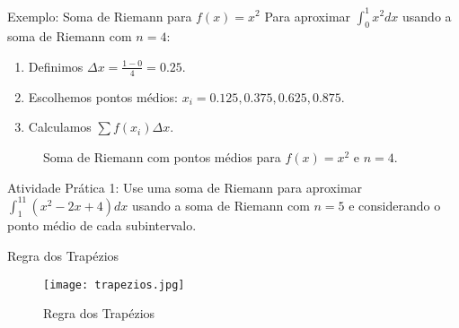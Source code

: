 \documentclass{beamer}
\begin{document}
\begin{frame}{Exemplo: Soma de Riemann para \( f(x) = x^2 \)}
    Para aproximar \( \int_{0}^{1} x^2 dx \) usando a soma de Riemann com \( n=4 \):
    \begin{enumerate}
        \item Definimos \( \Delta x = \displaystyle \frac{1-0}{4} = 0.25 \).
        \item Escolhemos pontos médios: \( x_i = 0.125, 0.375, 0.625, 0.875 \).
        \item Calculamos \( \sum f(x_i) \Delta x \).
    \end{enumerate}

    \begin{figure}[h]
    \centering
    \caption{Soma de Riemann com pontos médios para \( f(x) = x^2 \) e \( n=4 \).}
\end{figure}

\end{frame}

\begin{frame}{Atividade Prática 1:}
    Use uma soma de Riemann para aproximar \( \displaystyle \int_{1}^{11} (x^2 - 2x + 4) dx \) usando a soma de Riemann com \( n=5 \) e considerando o ponto médio de cada subintervalo.

\end{frame}

\begin{frame}{Regra dos Trapézios}

\begin{figure}
    \centering
    \texttt{[image: trapezios.jpg]}
    \caption{Regra dos Trapézios}
    \label{fig:my_label}
\end{figure}

\end{frame}
\end{document}
